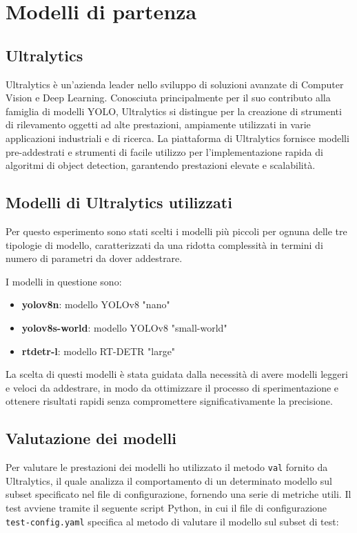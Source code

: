 \section{Modelli di partenza}

\subsection{Ultralytics}
Ultralytics\cite{40} è un'azienda leader nello sviluppo di soluzioni avanzate di Computer Vision e Deep Learning. Conosciuta principalmente per il suo contributo alla famiglia di modelli YOLO, Ultralytics si distingue per la creazione di strumenti di rilevamento oggetti ad alte prestazioni, ampiamente utilizzati in varie applicazioni industriali e di ricerca. La piattaforma di Ultralytics fornisce modelli pre-addestrati e strumenti di facile utilizzo per l'implementazione rapida di algoritmi di object detection, garantendo prestazioni elevate e scalabilità.

\subsection{Modelli di Ultralytics utilizzati}
Per questo esperimento sono stati scelti i modelli più piccoli per ognuna delle tre tipologie di modello, caratterizzati da una ridotta complessità in termini di numero di parametri da dover addestrare.

I modelli in questione sono:
\begin{itemize}
    \item \textbf{yolov8n}: modello YOLOv8 "nano"\cite{27}
    \item \textbf{yolov8s-world}: modello YOLOv8 "small-world"\cite{30}
    \item \textbf{rtdetr-l}: modello RT-DETR "large"\cite{32}
\end{itemize}

La scelta di questi modelli è stata guidata dalla necessità di avere modelli leggeri e veloci da addestrare, in modo da ottimizzare il processo di sperimentazione e ottenere risultati rapidi senza compromettere significativamente la precisione.

\newpage

\subsection{Valutazione dei modelli}
Per valutare le prestazioni dei modelli ho utilizzato il metodo \texttt{val}\cite{41} fornito da Ultralytics, il quale analizza il comportamento di un determinato modello sul subset specificato nel file di configurazione, fornendo una serie di metriche utili. Il test avviene tramite il seguente script Python, in cui il file di configurazione \texttt{test-config.yaml} specifica al metodo di valutare il modello sul subset di test: 

